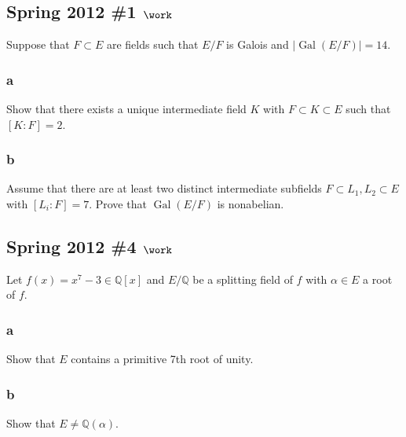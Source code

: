 \hypertarget{spring-2012-1-work}{%
\subsection{\texorpdfstring{Spring 2012 \#1
\(\work\)}{Spring 2012 \#1 \textbackslash work}}\label{spring-2012-1-work}}

Suppose that \(F\subset E\) are fields such that \(E/F\) is Galois and
\({\left\lvert {\operatorname{Gal}(E/F)} \right\rvert} = 14\).

\hypertarget{a-82}{%
\subsubsection{a}\label{a-82}}

Show that there exists a unique intermediate field \(K\) with
\(F\subset K \subset E\) such that \([K: F] = 2\).

\hypertarget{b-72}{%
\subsubsection{b}\label{b-72}}

Assume that there are at least two distinct intermediate subfields
\(F \subset L_1, L_2 \subset E\) with \([L_i: F]= 7\). Prove that
\(\operatorname{Gal}(E/F)\) is nonabelian.

\hypertarget{spring-2012-4-work}{%
\subsection{\texorpdfstring{Spring 2012 \#4
\(\work\)}{Spring 2012 \#4 \textbackslash work}}\label{spring-2012-4-work}}

Let \(f(x) = x^7 - 3\in {\mathbb{Q}}[x]\) and \(E/{\mathbb{Q}}\) be a
splitting field of \(f\) with \(\alpha \in E\) a root of \(f\).

\hypertarget{a-83}{%
\subsubsection{a}\label{a-83}}

Show that \(E\) contains a primitive 7th root of unity.

\hypertarget{b-73}{%
\subsubsection{b}\label{b-73}}

Show that \(E\neq {\mathbb{Q}}(\alpha)\).

